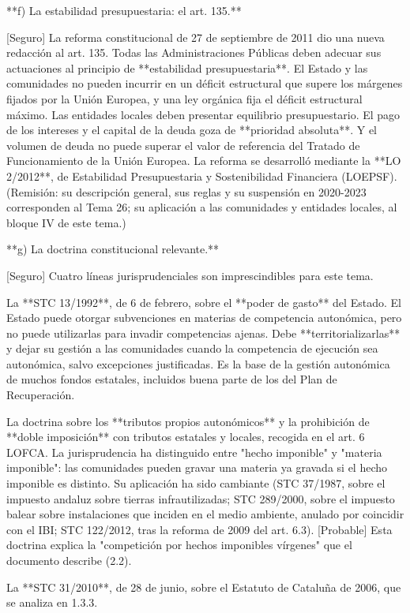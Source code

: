 \documentclass[10pt,a4paper]{article}
\begin{document}
**f) La estabilidad presupuestaria: el art. 135.**

[Seguro] La reforma constitucional de 27 de septiembre de 2011 dio una nueva redacción al art. 135. Todas las Administraciones Públicas deben adecuar sus actuaciones al principio de **estabilidad presupuestaria**. El Estado y las comunidades no pueden incurrir en un déficit estructural que supere los márgenes fijados por la Unión Europea, y una ley orgánica fija el déficit estructural máximo. Las entidades locales deben presentar equilibrio presupuestario. El pago de los intereses y el capital de la deuda goza de **prioridad absoluta**. Y el volumen de deuda no puede superar el valor de referencia del Tratado de Funcionamiento de la Unión Europea. La reforma se desarrolló mediante la **LO 2/2012**, de Estabilidad Presupuestaria y Sostenibilidad Financiera (LOEPSF). (Remisión: su descripción general, sus reglas y su suspensión en 2020-2023 corresponden al Tema 26; su aplicación a las comunidades y entidades locales, al bloque IV de este tema.)

**g) La doctrina constitucional relevante.**

[Seguro] Cuatro líneas jurisprudenciales son imprescindibles para este tema.

La **STC 13/1992**, de 6 de febrero, sobre el **poder de gasto** del Estado. El Estado puede otorgar subvenciones en materias de competencia autonómica, pero no puede utilizarlas para invadir competencias ajenas. Debe **territorializarlas** y dejar su gestión a las comunidades cuando la competencia de ejecución sea autonómica, salvo excepciones justificadas. Es la base de la gestión autonómica de muchos fondos estatales, incluidos buena parte de los del Plan de Recuperación.

La doctrina sobre los **tributos propios autonómicos** y la prohibición de **doble imposición** con tributos estatales y locales, recogida en el art. 6 LOFCA. La jurisprudencia ha distinguido entre "hecho imponible" y "materia imponible": las comunidades pueden gravar una materia ya gravada si el hecho imponible es distinto. Su aplicación ha sido cambiante (STC 37/1987, sobre el impuesto andaluz sobre tierras infrautilizadas; STC 289/2000, sobre el impuesto balear sobre instalaciones que inciden en el medio ambiente, anulado por coincidir con el IBI; STC 122/2012, tras la reforma de 2009 del art. 6.3). [Probable] Esta doctrina explica la "competición por hechos imponibles vírgenes" que el documento describe (2.2).

La **STC 31/2010**, de 28 de junio, sobre el Estatuto de Cataluña de 2006, que se analiza en 1.3.3.
\end{document}
